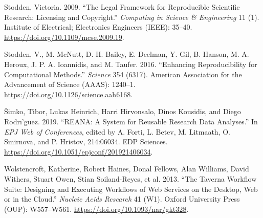 \documentclass[onecolumn]{article}
\begin{document}
\leavevmode\hypertarget{ref-stodden2008legal}{}%
Stodden, Victoria. 2009. ``The Legal Framework for Reproducible
Scientific Research: Licensing and Copyright.'' \emph{Computing in
Science \& Engineering} 11 (1). Institute of Electrical; Electronics
Engineers (IEEE): 35--40. \url{https://doi.org/10.1109/mcse.2009.19}.

\leavevmode\hypertarget{ref-stodden2016enhancing}{}%
Stodden, V., M. McNutt, D. H. Bailey, E. Deelman, Y. Gil, B. Hanson, M.
A. Heroux, J. P. A. Ioannidis, and M. Taufer. 2016. ``Enhancing
Reproducibility for Computational Methods.'' \emph{Science} 354 (6317).
American Association for the Advancement of Science (AAAS): 1240--1.
\url{https://doi.org/10.1126/science.aah6168}.

\leavevmode\hypertarget{ref-vsimko2019reana}{}%
Šimko, Tibor, Lukas Heinrich, Harri Hirvonsalo, Dinos Kousidis, and
Diego Rodrı'guez. 2019. ``REANA: A System for Reusable Research Data
Analyses.'' In \emph{EPJ Web of Conferences}, edited by A. Forti, L.
Betev, M. Litmaath, O. Smirnova, and P. Hristov, 214:06034. EDP
Sciences. \url{https://doi.org/10.1051/epjconf/201921406034}.

\leavevmode\hypertarget{ref-wolstencroft2013taverna}{}%
Wolstencroft, Katherine, Robert Haines, Donal Fellows, Alan Williams,
David Withers, Stuart Owen, Stian Soiland-Reyes, et al. 2013. ``The
Taverna Workflow Suite: Designing and Executing Workflows of Web
Services on the Desktop, Web or in the Cloud.'' \emph{Nucleic Acids
Research} 41 (W1). Oxford University Press (OUP): W557--W561.
\url{https://doi.org/10.1093/nar/gkt328}.
\end{document}
